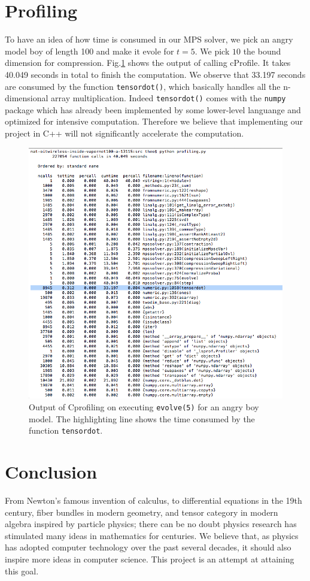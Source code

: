 \documentclass[english]{article}[12pt]
\begin{document}
\section{Profiling}
To have an idea of how time is consumed in our MPS solver, we pick an angry model boy of length 100 and make it evole for $t=5$. We pick $10$ the bound dimension for compression. Fig.\ref{fig:prof} shows the output of calling cProfile. It takes 40.049 seconds in total to finish the computation. We observe that 33.197 seconds are consumed by the function \texttt{tensordot()}, which basically handles all the n-dimensional array multiplication. Indeed \texttt{tensordot()} comes with the \texttt{numpy} package which has already been implemented by some lower-level languange and optimized for intensive computation. Therefore we believe that implementing our project in C++ will not significantly accelerate the computation. 
\begin{figure}[H]
\centering
\includegraphics[scale=0.4]{Result_Fig/profiling.png}
\caption{Output of Cprofiling on executing \texttt{evolve(5)} for an angry boy model. The highlighting line shows the time consumed by the function \texttt{tensordot}.}
\label{fig:prof}
\end{figure} 

\section{Conclusion}
From Newton's famous invention of calculus, to differential equations in the 19th century, fiber bundles in modern geometry, and tensor category in modern algebra inspired by particle physics; there can be no doubt physics research has stimulated many ideas in mathematics for centuries. We believe that, as physics has adopted computer technology over the past several decades, it should also inspire more ideas in computer science. This project is an attempt at attaining this goal.
\end{document}
